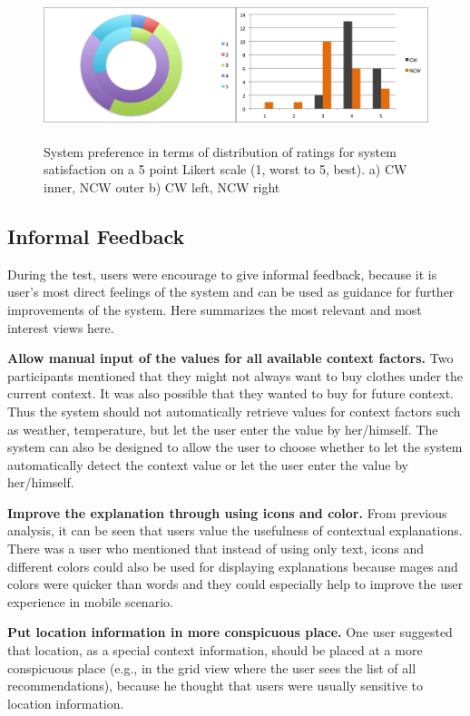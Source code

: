 \begin{figure}[H]
	\centering
	\includegraphics[height=1.7in]{figures/systemSatisfaction.png}
	\caption{System preference in terms of distribution of ratings for system satisfaction on a 5 point Likert scale (1, worst to 5, best). a) CW inner, NCW outer b) CW left, NCW right}
	\label{fig:systemSatisfaction}
\end{figure}

\subsection{Informal Feedback} \label{sec:results_if}

During the test, users were encourage to give informal feedback, because it is user's most direct feelings of the system and can be used as guidance for further improvements of the system. Here summarizes the most relevant and most interest views here.

\textbf{Allow manual input of the values for all available context factors.} Two participants mentioned that they might not always want to buy clothes under the current context. It was also possible that they wanted to buy for future context. Thus the system should not automatically retrieve values for context factors such as weather, temperature, but let the user enter the value by her/himself. The system can also be designed to allow the user to choose whether to let the system automatically detect the context value or let the user enter the value by her/himself.

\textbf{Improve the explanation through using icons and color.} From previous analysis, it can be seen that users value the usefulness of contextual explanations. There was a user who mentioned that instead of using only text, icons and different colors could also be used for displaying explanations because mages and colors were quicker than words and they could especially help to improve the user experience in mobile scenario.
 
\textbf{Put location information in more conspicuous place.} One user suggested that location, as a special context information, should be placed at a more conspicuous place (e.g., in the grid view where the user sees the list of all recommendations), because he thought that users were usually sensitive to location information.  

